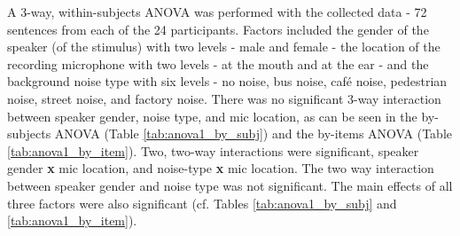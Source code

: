 \documentclass[dissertation,copyright]{uathesis}
\begin{document}
A 3-way, within-subjects ANOVA was performed with the collected data - 72 sentences from each of the 24 participants. Factors included the gender of the speaker (of the stimulus) with two levels - male and female - the location of the recording microphone with two levels - at the mouth and at the ear - and the background noise type with six levels - no noise, bus noise, caf\'{e} noise, pedestrian noise, street noise, and factory noise.  There was no significant 3-way interaction between speaker gender, noise type, and mic location, as can be seen in the by-subjects ANOVA (Table \ref{tab:anova1_by_subj}) and the by-items ANOVA (Table \ref{tab:anova1_by_item}). Two, two-way interactions were significant, speaker gender \textbf{x} mic location, and noise-type \textbf{x} mic location. The two way interaction between speaker gender and noise type was not significant.  The main effects of all three factors were also significant (cf. Tables \ref{tab:anova1_by_subj} and \ref{tab:anova1_by_item}).
\end{document}

